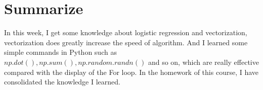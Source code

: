 \documentclass[a4paper]{article}
\begin{document}
\section{Summarize}
In this week, I get some knowledge about logistic regression and vectorization, vectorization does greatly increase the speed of algorithm. And I learned some simple commands in Python such as $np.dot(), np.sum(), np.random.randn()$ and so on, which are really effective compared with the display of the For loop. In the homework of this course, I have consolidated the knowledge I learned. 
\end{document}
